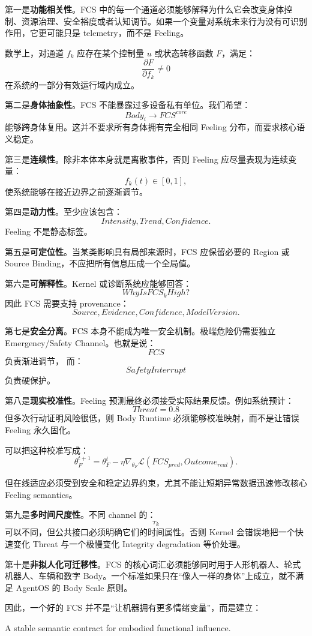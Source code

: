 第一是\textbf{功能相关性}。FCS 中的每一个通道必须能够解释为什么它会改变身体控制、资源治理、安全裕度或者认知调节。如果一个变量对系统未来行为没有可识别作用，它更可能只是 telemetry，而不是 Feeling。

数学上，对通道 $f_k$ 应存在某个控制量 $u$ 或状态转移函数 $F$，满足：
\[
\frac{\partial F}{\partial f_k}
\neq0
\]
在系统的一部分有效运行域内成立。

第二是\textbf{身体抽象性}。FCS 不能暴露过多设备私有单位。我们希望：
\[
Body_i
\rightarrow
FCS^{core}
\]
能够跨身体复用。这并不要求所有身体拥有完全相同 Feeling 分布，而要求核心语义稳定。

第三是\textbf{连续性}。除非本体本身就是离散事件，否则 Feeling 应尽量表现为连续变量：
\[
f_k(t)\in[0,1],
\]
使系统能够在接近边界之前逐渐调节。

第四是\textbf{动力性}。至少应该包含：
\[
Intensity,
Trend,
Confidence.
\]
Feeling 不是静态标签。

第五是\textbf{可定位性}。当某类影响具有局部来源时，FCS 应保留必要的 Region 或 Source Binding，不应把所有信息压成一个全局值。

第六是\textbf{可解释性}。Kernel 或诊断系统应能够回答：
\[
WhyIsFCS_kHigh?
\]
因此 FCS 需要支持 provenance：
\[
Source,
Evidence,
Confidence,
ModelVersion.
\]

第七是\textbf{安全分离}。FCS 本身不能成为唯一安全机制。极端危险仍需要独立 Emergency/Safety Channel。也就是说：
\[
FCS
\]
负责渐进调节，
而：
\[
SafetyInterrupt
\]
负责硬保护。

第八是\textbf{现实校准性}。Feeling 预测最终必须接受实际结果反馈。例如系统预计：
\[
Threat=0.8
\]
但多次行动证明风险很低，则 Body Runtime 必须能够校准映射，而不是让错误 Feeling 永久固化。

可以把这种校准写成：
\[
\theta_F^{t+1}
=
\theta_F^t
-
\eta
\nabla_{\theta_F}
\mathcal L
(
FCS_{pred},
Outcome_{real}
).
\]

但在线适应必须受到安全和稳定边界约束，尤其不能让短期异常数据迅速修改核心 Feeling semantics。

第九是\textbf{多时间尺度性}。不同 channel 的：
\[
\tau_k
\]
可以不同，但公共接口必须明确它们的时间属性。否则 Kernel 会错误地把一个快速变化 Threat 与一个极慢变化 Integrity degradation 等价处理。

第十是\textbf{非拟人化可迁移性}。FCS 的核心词汇必须能够同时用于人形机器人、轮式机器人、车辆和数字 Body。一个标准如果只在“像人一样的身体”上成立，就不满足 AgentOS 的 Body Scale 原则。

因此，一个好的 FCS 并不是“让机器拥有更多情绪变量”，而是建立：
\begin{statementbox}
A stable semantic contract for embodied functional influence.
\end{statementbox}

